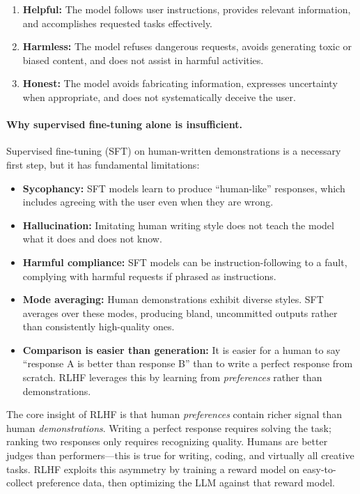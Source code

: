 \begin{enumerate}[leftmargin=*]
\item \textbf{Helpful:} The model follows user instructions, provides
  relevant information, and accomplishes requested tasks effectively.
\item \textbf{Harmless:} The model refuses dangerous requests, avoids
  generating toxic or biased content, and does not assist in harmful
  activities.
\item \textbf{Honest:} The model avoids fabricating information, expresses
  uncertainty when appropriate, and does not systematically deceive the
  user.
\end{enumerate}

\paragraph{Why supervised fine-tuning alone is insufficient.}
Supervised fine-tuning (SFT) on human-written demonstrations is a necessary
first step, but it has fundamental limitations:

\begin{itemize}[leftmargin=*]
\item \textbf{Sycophancy:} SFT models learn to produce ``human-like''
  responses, which includes agreeing with the user even when they are wrong.
\item \textbf{Hallucination:} Imitating human writing style does not teach
  the model what it does and does not know.
\item \textbf{Harmful compliance:} SFT models can be instruction-following
  to a fault, complying with harmful requests if phrased as instructions.
\item \textbf{Mode averaging:} Human demonstrations exhibit diverse styles.
  SFT averages over these modes, producing bland, uncommitted outputs rather
  than consistently high-quality ones.
\item \textbf{Comparison is easier than generation:} It is easier for a
  human to say ``response A is better than response B'' than to write a
  perfect response from scratch.  RLHF leverages this by learning from
  \emph{preferences} rather than demonstrations.
\end{itemize}

\begin{keyinsight}
The core insight of RLHF is that human \emph{preferences} contain richer
signal than human \emph{demonstrations}.  Writing a perfect response
requires solving the task; ranking two responses only requires recognizing
quality.  Humans are better judges than performers---this is true for
writing, coding, and virtually all creative tasks.  RLHF exploits this
asymmetry by training a reward model on easy-to-collect preference data,
then optimizing the LLM against that reward model.
\end{keyinsight}

